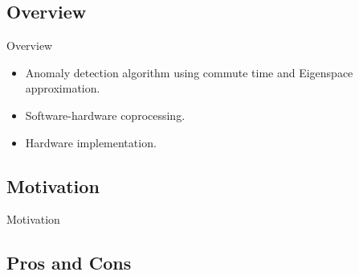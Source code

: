 \subsection{Overview}
\begin{frame}{Overview}
    \begin{itemize}
        \item Anomaly detection algorithm using commute time and Eigenspace
            approximation.
        \item Software-hardware coprocessing.
        \item Hardware implementation.
    \end{itemize}
\end{frame}

\subsection{Motivation}
\begin{frame}{Motivation}
\end{frame}

\subsection{Pros and Cons}
\begin{frame}
\end{frame}